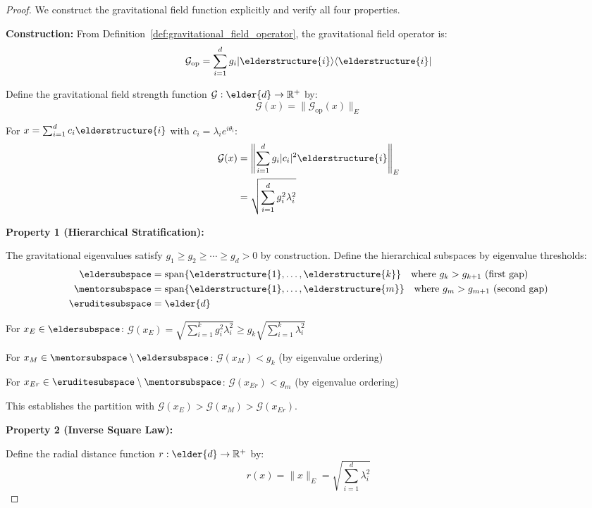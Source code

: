 \begin{proof}
We construct the gravitational field function explicitly and verify all four properties.

\textbf{Construction:}
From Definition~\ref{def:gravitational_field_operator}, the gravitational field operator is:
$$\mathcal{G}_{\text{op}} = \sum_{i=1}^{d} g_i |\elderstructure{i}\rangle\langle\elderstructure{i}|$$

Define the gravitational field strength function $\mathcal{G}: \elder{d} \rightarrow \mathbb{R}^+$ by:
$$\mathcal{G}(x) = \|\mathcal{G}_{\text{op}}(x)\|_E$$

For $x = \sum_{i=1}^{d} c_i \elderstructure{i}$ with $c_i = \lambda_i e^{i\theta_i}$:
\begin{align}
\mathcal{G}(x) &= \left\|\sum_{i=1}^{d} g_i |c_i|^2 \elderstructure{i}\right\|_E \\
&= \sqrt{\sum_{i=1}^{d} g_i^2 \lambda_i^2}
\end{align}

\textbf{Property 1 (Hierarchical Stratification):}

The gravitational eigenvalues satisfy $g_1 \geq g_2 \geq \cdots \geq g_d > 0$ by construction. Define the hierarchical subspaces by eigenvalue thresholds:
\begin{align}
\eldersubspace &= \mathrm{span}\{\elderstructure{1}, \ldots, \elderstructure{k}\} \quad \text{where } g_k > g_{k+1} \text{ (first gap)} \\
\mentorsubspace &= \mathrm{span}\{\elderstructure{1}, \ldots, \elderstructure{m}\} \quad \text{where } g_m > g_{m+1} \text{ (second gap)} \\
\eruditesubspace &= \elder{d}
\end{align}

For $x_E \in \eldersubspace$: $\mathcal{G}(x_E) = \sqrt{\sum_{i=1}^{k} g_i^2 \lambda_i^2} \geq g_k \sqrt{\sum_{i=1}^{k} \lambda_i^2}$

For $x_M \in \mentorsubspace \setminus \eldersubspace$: $\mathcal{G}(x_M) < g_k$ (by eigenvalue ordering)

For $x_{Er} \in \eruditesubspace \setminus \mentorsubspace$: $\mathcal{G}(x_{Er}) < g_m$ (by eigenvalue ordering)

This establishes the partition with $\mathcal{G}(x_E) > \mathcal{G}(x_M) > \mathcal{G}(x_{Er})$.

\textbf{Property 2 (Inverse Square Law):}

Define the radial distance function $r: \elder{d} \rightarrow \mathbb{R}^+$ by:
$$r(x) = \|x\|_E = \sqrt{\sum_{i=1}^{d} \lambda_i^2}$$


\end{proof}
